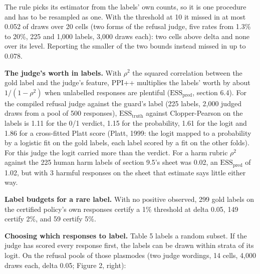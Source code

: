 \documentclass[11pt]{article}
\begin{document}
The rule picks its estimator from the labels' own counts, so it is one procedure and has to be resampled as one. With the threshold at 10 it missed in at most 0.052 of draws over 20 cells (two forms of the refusal judge, five rates from 1.3\% to 20\%, 225 and 1,000 labels, 3,000 draws each): two cells above delta and none over its level. Reporting the smaller of the two bounds instead missed in up to 0.078.


\textbf{The judge's worth in labels.} With $\rho ^{2}$ the squared correlation between the gold label and the judge's feature, PPI++ multiplies the labels' worth by about $1 / (1 - \rho ^{2})$ when unlabelled responses are plentiful ($\mathrm{ESS}_{\mathrm{pred}}$, section 6.4). For the compiled refusal judge against the guard's label (225 labels, 2,000 judged draws from a pool of 500 responses), $\mathrm{ESS}_{\mathrm{truth}}$ against Clopper-Pearson on the labels is 1.11 for the 0/1 verdict, 1.15 for the probability, 1.61 for the logit and 1.86 for a cross-fitted Platt score (Platt, 1999: the logit mapped to a probability by a logistic fit on the gold labels, each label scored by a fit on the other folds). For this judge the logit carried more than the verdict. For a harm rubric $\rho ^{2}$ against the 225 human harm labels of section 9.5's sheet was 0.02, an $\mathrm{ESS}_{\mathrm{pred}}$ of 1.02, but with 3 harmful responses on the sheet that estimate says little either way.


\textbf{Label budgets for a rare label.} With no positive observed, 299 gold labels on the certified policy's own responses certify a 1\% threshold at delta 0.05, 149 certify 2\%, and 59 certify 5\%.


\textbf{Choosing which responses to label.} Table 5 labels a random subset. If the judge has scored every response first, the labels can be drawn within strata of its logit. On the refusal pools of those plasmodes (two judge wordings, 14 cells, 4,000 draws each, delta 0.05; Figure 2, right):
\end{document}
